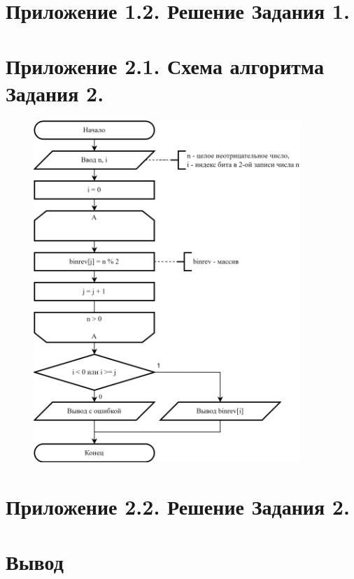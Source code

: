 \documentclass[oneside,a4paper,14pt]{extarticle} %
\begin{document}
\section*{Приложение 1.2. Решение Задания 1.}
\newpage
\section*{Приложение 2.1. Схема алгоритма Задания 2.}
\begin{figure}[h!]
	\centering
	\includegraphics[width=0.9\textwidth]{pics/2-flowchart.png}
\end{figure}
\newpage
\section*{Приложение 2.2. Решение Задания 2.}
\newpage
\section*{Вывод}
\end{document}
